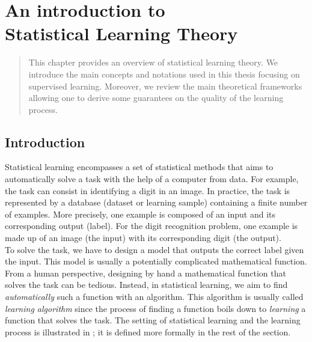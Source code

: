 \chapter[An introduction to Statistical Learning Theory]{An introduction to\\ Statistical Learning Theory}
\label{chap:intro}

\minitoc

\addchapterlof
\addchapterloa
\addchapterloe

\begin{abstract}
    This chapter provides an overview of statistical learning theory.
    We introduce the main concepts and notations used in this thesis focusing on supervised learning.
    Moreover, we review the main theoretical frameworks allowing one to derive some guarantees on the quality of the learning process.
\end{abstract}

\newpage

\section{Introduction}
\label{chap:intro:sec:intro}
Statistical learning encompasses a set of statistical methods that aims to automatically solve a task with the help of a computer from data.
For example, the task can consist in identifying a digit in an image.
In practice, the task is represented by a database (\aka dataset or learning sample) containing a finite number of examples.
More precisely, one example is composed of an input and its corresponding output (\aka label).
For the digit recognition problem, one example is made up of an image (the input) with its corresponding digit (the output).\\

To solve the task, we have to design a model that outputs the correct label given the input.
This model is usually a potentially complicated mathematical function.
From a human perspective, designing by hand a mathematical function that solves the task can be tedious.
Instead, in statistical learning, we aim to find {\it automatically} such a function with an algorithm.
This algorithm is usually called {\it learning algorithm} since the process of finding a function boils down to {\it learning} a function that solves the task.
The setting of statistical learning and the learning process is illustrated in ; it is defined more formally in the rest of the section.\\

